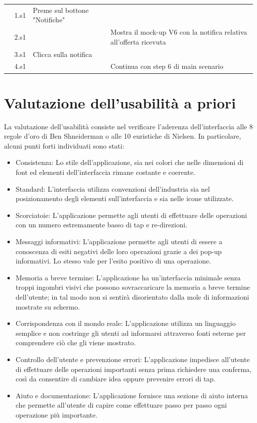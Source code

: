 \begin{longtable}{|C{3.0cm}|C{1.3cm}|L{5.2cm}|L{5.2cm}|}
                        & 1.s1
                        & Preme sul bottone "Notifiche"
                        & \\
                        & 2.s1
                        & 
                        & Mostra il mock-up V6 con la notifica relativa all'offerta ricevuta\\
                        & 3.s1
                        & Clicca sulla notifica
                        & \\
                        & 4.s1
                        &
                        & Continua con step 6 di main scenario\\
                \hline
            \end{longtable}

    \section{Valutazione dell’usabilità a priori}
    La valutazione dell'usabilità consiste nel verificare l'aderenza dell'interfaccia alle 8 regole d'oro di Ben Shneiderman o alle 10 euristiche di Nielsen. In particolare, alcuni punti forti individuati sono stati:
    \begin{itemize}
        \item Consistenza: Lo stile dell'applicazione, sia nei colori che nelle dimensioni di font ed elementi dell'interfaccia rimane costante e coerente.
        \item Standard: L'interfaccia utilizza convenzioni dell'industria sia nel posizionamento degli elementi sull'interfaccia e sia nelle icone utilizzate.
        \item Scorciatoie: L'applicazione permette agli utenti di effettuare delle operazioni con un numero estremamente basso di tap e re-direzioni.
        \item Messaggi informativi: L'applicazione permette agli utenti di essere a conoscenza di esiti negativi delle loro operazioni grazie a dei pop-up informativi. Lo stesso vale per l'esito positivo di una operazione.
        \item Memoria a breve termine: L'applicazione ha un'interfaccia minimale senza troppi ingombri visivi che possono sovraccaricare la memoria a breve termine dell'utente; in tal modo non si sentirà disorientato dalla mole di informazioni mostrate su schermo.
        \item Corrispondenza con il mondo reale: L'applicazione utilizza un linguaggio semplice e non costringe gli utenti ad informarsi attraverso fonti esterne per comprendere ciò che gli viene mostrato.
        \item Controllo dell'utente e prevenzione errori: L'applicazione impedisce all'utente di effettuare delle operazioni importanti senza prima richiedere una conferma, così da consentire di cambiare idea oppure prevenire errori di tap.
        \item Aiuto e documentazione: L'applicazione fornisce una sezione di aiuto interna che permette all'utente di capire come effettuare passo per passo ogni operazione più importante.
    \end{itemize}
